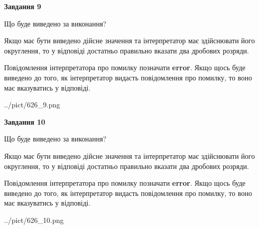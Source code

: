 \documentclass[12pt, ukrainian]{article}
\begin{document}
{\begin {Large}
{\begin {center}\textbf{Завдання 9}\end {center}}\par
Що буде виведено за виконання? \par

Якщо має бути виведено дійсне значення та інтерпретатор має здійснювати його округлення, 
то у відповіді достатньо правильно вказати два дробових розряди.

Повідомлення інтерпретатора про помилку позначати \textbf{error}.
Якщо щось буде виведено до того, як інтерпретатор видасть повідомлення про помилку, 
то воно має вказуватись у відповіді. \par

\begin{center}
	{../pict/626_9.png}
\end{center}
\newpage

{\begin {center}\textbf{Завдання 10}\end {center}}\par
Що буде виведено за виконання? \par

Якщо має бути виведено дійсне значення та інтерпретатор має здійснювати його округлення, 
то у відповіді достатньо правильно вказати два дробових розряди.

Повідомлення інтерпретатора про помилку позначати \textbf{error}.
Якщо щось буде виведено до того, як інтерпретатор видасть повідомлення про помилку, 
то воно має вказуватись у відповіді. \par

\begin{center}
	{../pict/626_10.png}
\end{center}
\newpage

\end {Large}}
\end{document}
